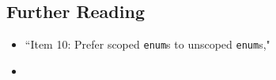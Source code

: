 \subsection[Further Reading]{Further Reading}\label{further-reading}

\begin{itemize}
\item{``Item 10: Prefer scoped \texttt{enum}s to unscoped \texttt{enum}s," \cite{meyers15}}
\item{\cite{grimm17}}
\end{itemize}

